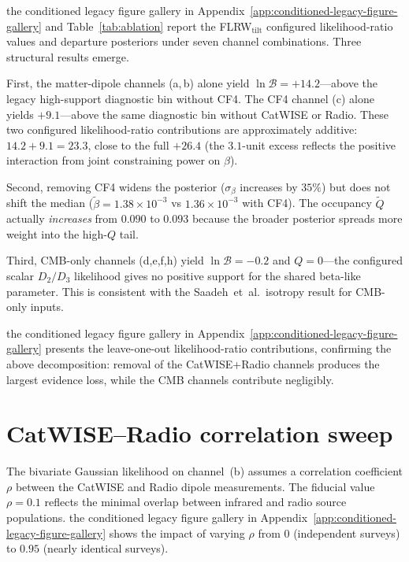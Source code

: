 the conditioned legacy figure gallery in Appendix~\ref{app:conditioned-legacy-figure-gallery} and
Table~\ref{tab:ablation} report the FLRW$_\mathrm{tilt}$
configured likelihood-ratio values and departure posteriors under seven channel
combinations.  Three structural results emerge.

First, the matter-dipole channels (a,\,b) alone yield
$\ln\mathcal{B} = +14.2$---above the legacy high-support
diagnostic bin without CF4.  The CF4
channel (c) alone yields $+9.1$---above the same diagnostic bin without CatWISE or
Radio.  These two configured likelihood-ratio contributions are approximately
additive: $14.2 + 9.1 = 23.3$, close to the full $+26.4$ (the
$3.1$-unit excess reflects the positive interaction from joint
constraining power on $\beta$).

Second, removing CF4 widens the posterior
($\sigma_\beta$ increases by $35\%$) but does not shift the
median ($\tilde{\beta} = 1.38 \times 10^{-3}$ vs $1.36 \times
10^{-3}$ with CF4).  The occupancy $\tilde{Q}$ actually
\emph{increases} from $0.090$ to $0.093$ because the broader
posterior spreads more weight into the high-$Q$ tail.

Third, CMB-only channels (d,e,f,h) yield $\ln\mathcal{B} = -0.2$
and $Q = 0$---the configured scalar $D_2/D_3$ likelihood gives
no positive support for the shared beta-like parameter.  This is
consistent with the Saadeh~et~al.\ isotropy result for CMB-only
inputs.

the conditioned legacy figure gallery in Appendix~\ref{app:conditioned-legacy-figure-gallery} presents the leave-one-out
likelihood-ratio contributions, confirming the above decomposition:
removal of the CatWISE+Radio channels produces the largest
evidence loss, while the CMB channels contribute negligibly.


\section{CatWISE--Radio correlation sweep}
\label{sec:rho-sweep}

The bivariate Gaussian likelihood on channel~(b) assumes a
correlation coefficient $\rho$ between the CatWISE and Radio
dipole measurements.  The fiducial value $\rho = 0.1$ reflects
the minimal overlap between infrared and radio source
populations.  the conditioned legacy figure gallery in Appendix~\ref{app:conditioned-legacy-figure-gallery} shows the impact of
varying $\rho$ from $0$ (independent surveys) to $0.95$ (nearly
identical surveys).

